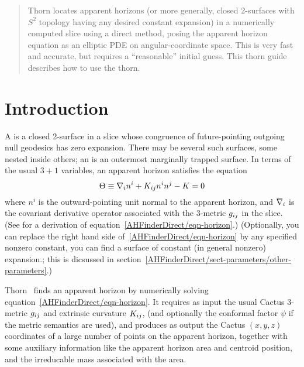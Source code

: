 \def\I{{\text{\scriptsize I}}}                  %
\def\J{{\text{\scriptsize J}}}                  %
\def\K{{\text{\scriptsize K}}}                  %
\def\M{{\text{\scriptsize M}}}                  %

\def\Jac[#1]{{\bf J} \bigl[ #1 \bigr]}          %

\begin{abstract}
Thorn  locates apparent horizons (or more
generally, closed 2-surfaces with $S^2$ topology having any desired
constant expansion) in a numerically computed slice using a direct
method, posing the apparent horizon equation as an elliptic PDE on
angular-coordinate space.  This is very fast and accurate, but
requires a ``reasonable'' initial guess.  This thorn guide describes
how to use the thorn.
\end{abstract}


\section{Introduction}

A  is a closed 2-surface in a slice whose
congruence of future-pointing outgoing null geodesics has zero expansion.
There may be several such surfaces, some nested inside others; an
 is an outermost marginally trapped surface.
In terms of the usual $3+1$ variables, an apparent horizon satisfies
the equation
\begin{equation}
\Theta \equiv \nabla_i n^i + K_{ij} n^i n^j - K = 0
					\label{AHFinderDirect/eqn-horizon}
\end{equation}
where $n^i$ is the outward-pointing unit normal to the apparent horizon,
and $\nabla_i$ is the covariant derivative operator associated with the
3-metric $g_{ij}$ in the slice.  (See \cite{AHFinderDirect/York89}
for a derivation of equation~\eqref{AHFinderDirect/eqn-horizon}.)
(Optionally, you can replace the right hand side
of~\eqref{AHFinderDirect/eqn-horizon} by any specified nonzero
constant, \ie{} you can find a surface of constant
(in general nonzero) expansion.; this is dicsussed in
section~\ref{AHFinderDirect/sect-parameters/other-parameters}.)

Thorn~ finds an apparent horizon by numerically
solving equation~\eqref{AHFinderDirect/eqn-horizon}.  It requires
as input the usual Cactus 3-metric $g_{ij}$ and extrinsic curvature
$K_{ij}$, (and optionally the conformal factor $\psi$ if the
 metric semantics are used),
and produces as output the Cactus $(x,y,z)$ coordinates of a large
number of points on the apparent horizon, together with some auxiliary
information like the apparent horizon area and centroid position, and
the irreducable mass associated with the area.

